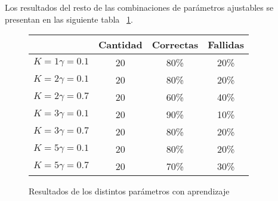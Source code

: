 Los resultados del resto de las combinaciones de par\'ametros ajustables se presentan en las siguiente tabla ~\ref{tabla:entramientos}.
\begin{figure}
\centering
\begin{tabular}{|c|c|c|c|}
\hline 
& Cantidad & Correctas & Fallidas \\ 
\hline 
$K = 1  \gamma = 0.1$ & 20 & 80\% & 20\% \\ 
\hline 
$K = 2  \gamma = 0.1$ & 20 & 80\% & 20\% \\ 
\hline 
$K = 2  \gamma = 0.7$ & 20 & 60\% & 40\% \\ 
\hline 
$K = 3  \gamma = 0.1$ & 20 & 90\% & 10\% \\ 
\hline 
$K = 3  \gamma = 0.7$ & 20 & 80\% & 20\% \\ 
\hline 
$K = 5  \gamma = 0.1$ & 20 & 80\% & 20\% \\ 
\hline  
$K = 5  \gamma = 0.7$ & 20 & 70\% & 30\% \\ 
\hline 

\end{tabular} 

\caption{Resultados de los distintos par\'ametros con aprendizaje}
\label{tabla:entramientos}


\end{figure}
%
%
%
%
